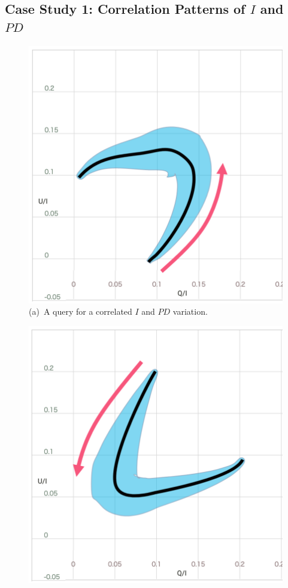 \subsection{Case Study 1: Correlation Patterns of $I$ and $PD$}\label{sec:correlate}
\begin{figure}[tb]
    \centering
    \begin{minipage}{0.49\linewidth}
        \centering
        \includegraphics[width=.9\linewidth]{vgtc_journal_latex/figures/QBScorrelate.png}\\
        \footnotesize{\sf(a)~A query for a correlated $I$ and $PD$ variation.}\\
    \end{minipage}
    \begin{minipage}{0.49\linewidth}
        \centering
        \includegraphics[width=.9\linewidth]{vgtc_journal_latex/figures/QBSanticorrelate.png}\\

\end{minipage}
\end{figure}
